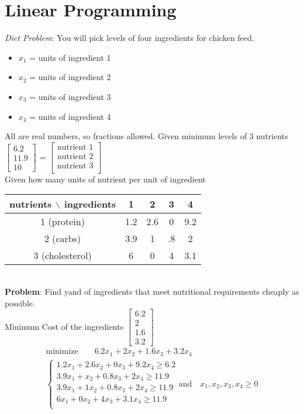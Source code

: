 \section*{Linear Programming}
\begin{example-N}
	\emph{Diet Problem}: You will pick levels of four ingredients for chicken feed.
	\begin{multicols}{2}
		\begin{itemize}
		\item $x_1$ = units of ingredient 1
		\item $x_2$ = units of ingredient 2
		\item $x_3$ = units of ingredient 3
		\item $x_4$ = units of ingredient 4 
	\end{itemize}
	\end{multicols}
	All are real numbers, so fractions allowed.
	Given minimum levels of 3 nutrients $\begin{bmatrix}
		6.2\\11.9\\10
	\end{bmatrix}$ = $\begin{bmatrix}
		\text{nutrient 1}\\
		\text{nutrient 2}\\
		\text{nutrient 3}\\
	\end{bmatrix}$\\
	Given how many units of nutrient per unit of ingredient\\
	\begin{tabular} {c||c|c|c|c}
	nutrients $\backslash$ ingredients & 1 & 2 & 3 & 4\\
	\hline 
		1 (protein) & 1.2 & 2.6 & 0 & 9.2\\
		2 (carbs) & 3.9 & 1 & .8 & 2\\
		3 (cholesterol) & 6 & 0 & 4 & 3.1
	\end{tabular}\\
	\textbf{Problem}: Find yand of ingredients that meet nutritional requirements cheaply as possible.\\
	Minimum Cost of the ingredients $\begin{bmatrix}
		6.2\\2\\1.6\\3.2
	\end{bmatrix}$
	\begin{gather*}
		\text{minimize} \qquad 6.2x_1 + 2x_2 + 1.6x_3 + 3.2x_4\\
		\begin{cases}
			1.2x_1 + 2.6x_2 + 0x_3 + 9.2x_4	\geq 6.2\\
		3.9x_1 + x_2 + 0.8x_3 + 2x_4 \geq 11.9\\
		3.9x_1 + 1x_2 + 0.8x_3 + 2 x_4 \geq 11.9\\
		6x_1 + 0x_2 + 4x_3 + 3.1x_4 \geq 11.9\\
		\end{cases}
		\text{and} \quad x_1, x_2, x_3, x_4 \geq 0
	\end{gather*}
\end{example-N}
